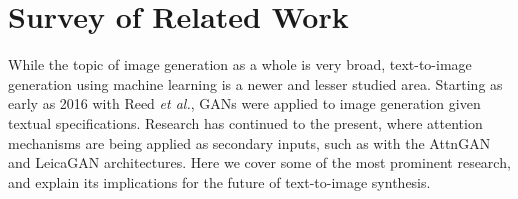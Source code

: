\documentclass[letterpaper]{article} %
\begin{document}
%
%
%

\section{Survey of Related Work}
While the topic of image generation as a whole is very broad, text-to-image 
generation using machine learning is a newer and lesser studied area. Starting 
as early as 2016 with Reed \textit{et al.}, GANs were applied to image 
generation given textual specifications. Research has continued to the present, 
where attention mechanisms are being applied as secondary inputs, such as with 
the AttnGAN \cite{attngan} and LeicaGAN \cite{leica} architectures. Here we 
cover some of the most prominent research, and explain its implications for the 
future of text-to-image synthesis.

\end{document}
